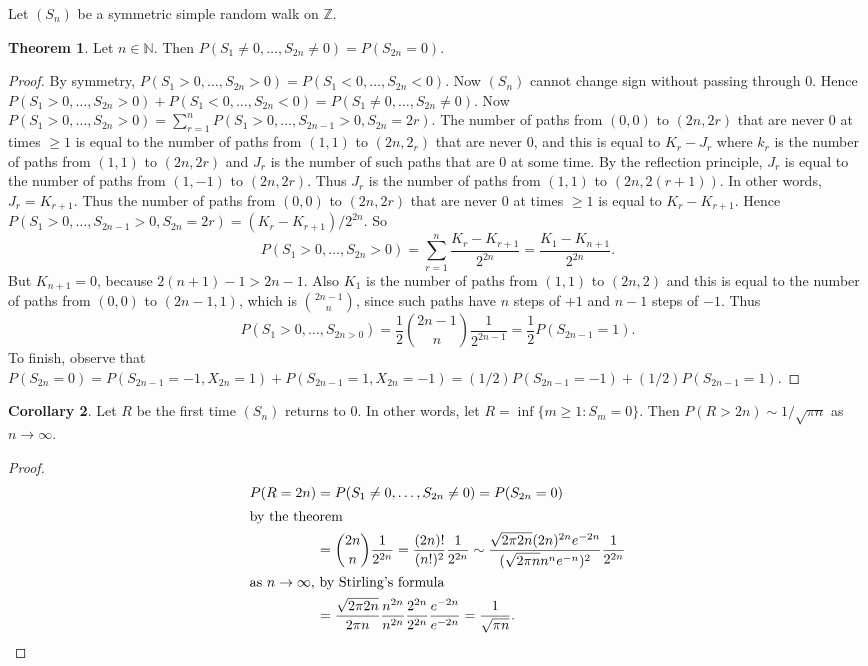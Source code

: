 \documentclass{article}
\newcommand{\Z}{\mathbb{Z}}
\newcommand{\N}{\mathbb{N}}
\theoremstyle{definition}
\newtheorem{theorem}{Theorem}
\newtheorem{corollary}[theorem]{Corollary}
\begin{document}
Let $(S_n)$ be a symmetric simple random walk on $\Z$.
\begin{theorem}
    Let $n \in \N$. Then $P(S_1 \neq 0, \dots, S_{2n} \neq 0) = P(S_{2n} = 0)$.
\end{theorem}
\begin{proof}
    By symmetry, $P(S_1 > 0, \dots, S_{2n} > 0) = P(S_1 < 0, \dots, S_{2n} < 0)$. Now $(S_n)$ cannot change sign without passing through $0$. Hence $P(S_1 > 0, \dots, S_{2n} > 0) + P(S_1 < 0, \dots, S_{2n} < 0) = P(S_1 \neq 0, \dots, S_{2n} \neq 0)$. Now $P(S_1 > 0, \dots, S_{2n} > 0) = \sum_{r = 1}^n P(S_1 > 0, \dots, S_{2n-1} > 0, S_{2n} = 2r)$. The number of paths from $(0,0)$ to $(2n, 2r)$ that are never $0$ at times $\geq 1$ is equal to the number of paths from $(1,1)$ to $(2n,2_r)$ that are never 0, and this is equal to $K_r - J_r$ where $k_r$ is the number of paths from $(1,1)$ to $(2n, 2r)$ and $J_r$ is the number of such paths that are 0 at some time. By the reflection principle, $J_r$ is equal to the number of paths from $(1,-1)$ to $(2n,2r)$. Thus $J_r$ is the number of paths from $(1,1)$ to $(2n, 2(r+1))$. In other words, $J_r = K_{r+1}$. Thus the number of paths from $(0,0)$ to $(2n, 2r)$ that are never $0$ at times $\geq 1$ is equal to $K_r - K_{r+1}$. Hence $P(S_1 > 0, \dots, S_{2n-1} > 0, S_{2n} = 2r) = (K_r - K_{r+1})/2^{2n}$. So
    \[
        P(S_1 > 0, \dots, S_{2n} > 0) = \sum_{r=1}^n \frac{K_r - K_{r+1}}{2^{2n}} = \frac{K_1 - K_{n+1}}{2^{2n}}.
    \]
    But $K_{n+1} = 0$, because $2(n+1) - 1 > 2n - 1$. Also $K_1$ is the number of paths from $(1,1)$ to $(2n,2)$ and this is equal to the number of paths from $(0,0)$ to $(2n-1, 1)$, which is $\binom{2n-1}{n}$, since such paths have $n$ steps of $+1$ and $n-1$ steps of $-1$. Thus
    \[
        P(S_1 > 0, \dots, S_{2n > 0}) = \frac{1}{2}\binom{2n-1}{n}\frac{1}{2^{2n-1}} = \frac{1}{2}P(S_{2n-1} = 1).
    \]
    To finish, observe that $P(S_{2n} = 0) = P(S_{2n-1} = -1, X_{2n} = 1) + P(S_{2n-1} = 1, X_{2n} = -1) = (1/2)P(S_{2n - 1} = -1) + (1/2)P(S_{2n - 1} = 1)$.
\end{proof}

\begin{corollary}
    Let $R$ be the first time $(S_n)$ returns to 0. In other words, let $R = \inf\{m \geq 1 : S_m = 0\}$. Then $P(R > 2n) \sim 1/\sqrt{\pi n}$ as $n \to \infty$.
\end{corollary}
\begin{proof}
    \begin{align*}
        P(R = 2n) &= P(S_1 \neq 0, \dots, S_{2n} \neq 0) = P(S_{2n} = 0) \\
        \intertext{by the theorem}
        &= \binom{2n}{n}\frac{1}{2^{2n}} = \frac{(2n)!}{(n!)^2}\frac{1}{2^{2n}} \sim \frac{\sqrt{2\pi 2n}(2n)^{2n} e^{-2n}}{(\sqrt{2\pi n} n^n e^{-n})^2}\frac{1}{2^{2n}} \\
        \intertext{as $n \to \infty$, by Stirling's formula}
        &= \frac{\sqrt{2\pi 2n}}{2\pi n} \frac{n^{2n}}{n^{2n}} \frac{2^{2n}}{2^{2n}} \frac{e^{-2n}}{e^{-2n}} = \frac{1}{\sqrt{\pi n}}.
    \end{align*}
\end{proof}
\end{document}
